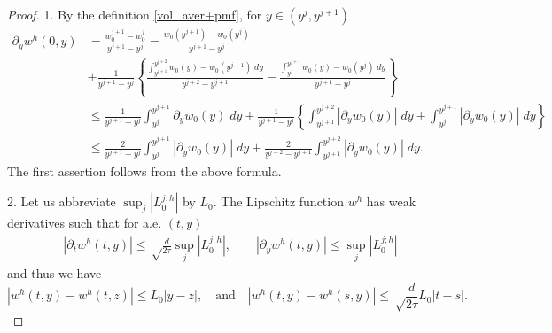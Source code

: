 \documentclass[a4paper,11pt]{article}
\def\red{\color{red}}
\theoremstyle{remark}
\begin{document}
\begin{proof}
 
 
1. By the definition \eqref{vol_aver+pmf}, for $y\in (y^j,y^{j+1})$
\begin{align*}
 \partial_y w^h(0,y) &= \frac{w_0^{j+1}-w_0^j}{y^{j+1}-y^j} =\frac{w_0(y^{j+1})-w_0(y^j)}{y^{j+1}-y^j} \\
 &+ \tfrac{1}{y^{j+1}-y^j}\left\{\frac{\int_{y^{j+1}}^{y^{j+2}} w_0(y)-w_0(y^{j+1}) \;dy}{y^{j+2}-y^{j+1}} - \frac{\int_{y^{j}}^{y^{j+1}} w_0(y)-w_0(y^{j}) \;dy}{y^{j+1}-y^{j}}\right\}\\
 &\le \tfrac{1}{{y^{j+1}-y^j}}\int_{y^j}^{y^{j+1}} \partial_y w_0(y) \; dy+\tfrac{1}{y^{j+1}-y^j}\left\{\int_{y^{j+1}}^{y^{j+2}} |\partial_y w_0(y)| \; dy + \int_{y^{j}}^{y^{j+1}} |\partial_y w_0(y)| \; dy\right\}\\
 &\le \tfrac{2}{{y^{j+1}-y^j}}\int_{y^j}^{y^{j+1}} |\partial_y w_0(y)| \; dy+\tfrac{2}{{y^{j+2}-y^{j+1}}}\int_{y^{j+1}}^{y^{j+2}} |\partial_y w_0(y)| \; dy.
\end{align*}
 The first assertion follows from the above formula.
 
 
 {\red
 2. Let us abbreviate $\sup_j |L_0^{j;h}|$ by $L_0$. The Lipschitz function $w^h$ has weak derivatives such that for a.e. $(t,y)$
 \begin{align*}
 |\partial_t w^h(t,y)| \le \sqrt\frac{{d}}{{2\tau}}\sup_j |L_0^{j;h}|,\quad \quad
 |\partial_y w^h(t,y)| \le \sup_j |L_0^{j;h}|
 \end{align*}
 and thus we have 
 $$|w^h(t,y) - w^h(t,z)| \le L_0|y-z|, \quad \text{and} \quad |w^h(t,y) - w^h(s,y)| \le \sqrt\frac{{d}}{{2\tau}}L_0|t-s|. $$
 
}
\end{proof}
\end{document}
